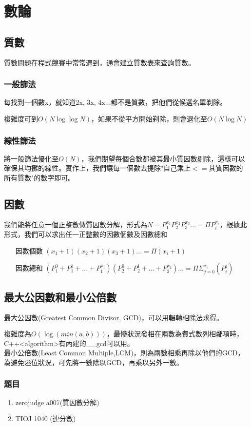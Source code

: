 \section{數論}
\subsection{質數}
質數問題在程式競賽中常常遇到，通會建立質數表來查詢質數。
\subsubsection{一般篩法}
每找到一個數x，就知道2x, 3x, 4x...都不是質數，把他們從候選名單剃除。

複雜度可到$O(N\log\log N)$，如果不從平方開始剃除，則會退化至$O(N\log N)$
\subsubsection{線性篩法}
將一般篩法優化至$O(N)$，我們期望每個合數都被其最小質因數剔除，這樣可以確保其均攤的線性。實作上，我們讓每一個數去提除"自己乘上$<=$其質因數的所有質數"的數字即可。

\subsection{因數}
我們能將任意一個正整數做質因數分解，形式為$N=P_{1}^{x_{1}}P_{2}^{x_{2}}P_{3}^{x_{3}}...=\Pi P_{i}^{x_{i}}$，根據此形式，我們可以求出任一正整數的因數個數及因數總和
\begin{enumerate}
\item [因數個數] $(x_{1}+1)(x_{2}+1)(x_{3}+1)...=\Pi (x_{i}+1)$
\item [因數總和] $(P_{1}^{0}+P_{1}^{1}+...+P_{1}^{x_{1}})(P_{2}^{0}+P_{2}^{1}+...+P_{2}^{x_{2}})...=\Pi\Sigma_{j=0}^{x_{i}}(P_{i}^{j})$
\end{enumerate}
\subsection{最大公因數和最小公倍數}
最大公因數(Greatest Common Divisor, GCD)，可以用輾轉相除法求得。

複雜度為$O(\log(min(a,b)))$，最慘狀況發相在兩數為費式數列相鄰項時，C++<algorithm>有內建的\_\_gcd可以用。\\
最小公倍數(Least Common Multiple,LCM)，則為兩數相乘再除以他們的GCD，為避免溢位狀況，可先將一數除以GCD，再乘以另外一數。
\subsubsection{題目}
\begin{enumerate}
\item zerojudge a007(質因數分解)
\item TIOJ 1040 (連分數)
\end{enumerate}
